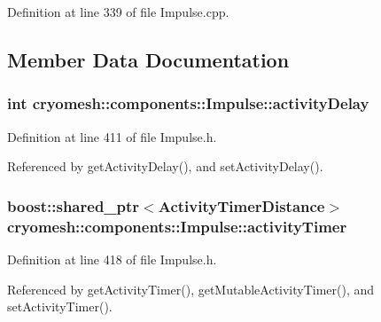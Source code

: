 \-Definition at line 339 of file \-Impulse.\-cpp.



\subsection{\-Member \-Data \-Documentation}
\hypertarget{classcryomesh_1_1components_1_1Impulse_ae491ccf924dc04674fb604a5258e0580}{
\subsubsection[{activity\-Delay}]{\setlength{\rightskip}{0pt plus 5cm}int {\bf cryomesh\-::components\-::\-Impulse\-::activity\-Delay}}}\label{classcryomesh_1_1components_1_1Impulse_ae491ccf924dc04674fb604a5258e0580}


\-Definition at line 411 of file \-Impulse.\-h.



\-Referenced by get\-Activity\-Delay(), and set\-Activity\-Delay().

\hypertarget{classcryomesh_1_1components_1_1Impulse_a6fc33296a0683cc08c5ea7404632a793}{
\subsubsection[{activity\-Timer}]{\setlength{\rightskip}{0pt plus 5cm}boost\-::shared\-\_\-ptr$<${\bf \-Activity\-Timer\-Distance}$>$ {\bf cryomesh\-::components\-::\-Impulse\-::activity\-Timer}}}\label{classcryomesh_1_1components_1_1Impulse_a6fc33296a0683cc08c5ea7404632a793}


\-Definition at line 418 of file \-Impulse.\-h.



\-Referenced by get\-Activity\-Timer(), get\-Mutable\-Activity\-Timer(), and set\-Activity\-Timer().

